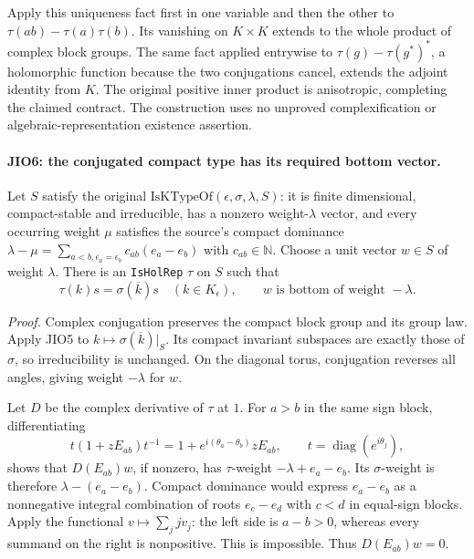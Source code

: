 Apply this uniqueness fact first in one variable and then the
other to
\(\tau(ab)-\tau(a)\tau(b)\).  Its vanishing on \(K\times K\)
extends to the whole product of complex block groups.
The same fact applied entrywise to
\(\tau(g)-\tau(g^*)^*\), a holomorphic function because the two
conjugations cancel, extends the adjoint identity from \(K\).
The original positive inner product is anisotropic, completing
the claimed contract.  The construction uses no unproved
complexification or algebraic-representation existence assertion.

\paragraph{JIO6: the conjugated compact type has its required bottom vector.}
\label{claim:JIO6}
Let \(S\) satisfy the original
\(\mathrm{IsKTypeOf}(\epsilon,\sigma,\lambda,S)\): it is finite
dimensional, compact-stable and irreducible, has a nonzero
weight-\(\lambda\) vector, and every occurring weight \(\mu\)
satisfies the source's compact dominance
\(\lambda-\mu=\sum_{a<b,\epsilon_a=\epsilon_b}c_{ab}(e_a-e_b)\)
with \(c_{ab}\in\mathbb N\).
Choose a unit vector \(w\in S\) of weight \(\lambda\).
There is an \texttt{IsHolRep} \(\tau\) on \(S\) such that
\[
       \tau(k)s=\sigma(\overline{k})s\quad(k\in K_\epsilon),
       \qquad
       w\text{ is bottom of weight }-\lambda.
 \tag{JIO.17}
\]

\emph{Proof.}
Complex conjugation preserves the compact block group and its
group law.  Apply JIO5 to \(k\mapsto\sigma(\overline{k})|_S\).
Its compact invariant subspaces are exactly those of \(\sigma\),
so irreducibility is unchanged.  On the diagonal torus,
conjugation reverses all angles, giving weight \(-\lambda\)
for \(w\).

Let \(D\) be the complex derivative of \(\tau\) at \(1\).
For \(a>b\) in the same sign block, differentiating
\[
 t(1+zE_{ab})t^{-1}
      =1+e^{i(\theta_a-\theta_b)}zE_{ab},
 \qquad t=\operatorname{diag}(e^{i\theta_j}),
 \tag{JIO.18}
\]
shows that \(D(E_{ab})w\), if nonzero, has \(\tau\)-weight
\(-\lambda+e_a-e_b\).  Its \(\sigma\)-weight is therefore
\(\lambda-(e_a-e_b)\).  Compact dominance would express
\(e_a-e_b\) as a nonnegative integral combination of roots
\(e_c-e_d\) with \(c<d\) in equal-sign blocks.
Apply the functional \(v\mapsto\sum_j jv_j\):
the left side is \(a-b>0\), whereas every summand on the right
is nonpositive.  This is impossible.  Thus \(D(E_{ab})w=0\).

